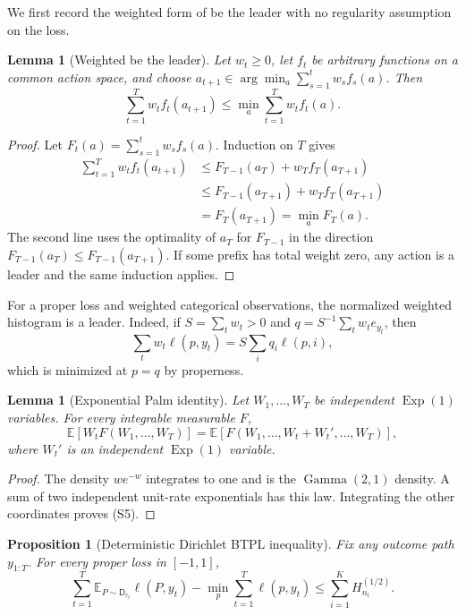 \documentclass[twoside]{article}
\newtheorem{lemma}[theorem]{Lemma}
\newtheorem{proposition}[theorem]{Proposition}
\newcommand{\E}{\mathbb E}
\newcommand{\D}{\mathsf D}
\begin{document}
We first record the weighted form of be the leader with no regularity assumption on the loss.

\begin{lemma}[Weighted be the leader]
\label{lem:weighted-btl}
Let $w_t\geq0$, let $f_t$ be arbitrary functions on a common action space, and choose $a_{t+1}\in\arg\min_a\sum_{s=1}^tw_sf_s(a)$. Then
\[
\sum_{t=1}^Tw_tf_t(a_{t+1})\leq\min_a\sum_{t=1}^Tw_tf_t(a).
\tag{S4}
\]
\end{lemma}

\begin{proof}
Let $F_t(a)=\sum_{s=1}^tw_sf_s(a)$. Induction on $T$ gives
\begin{align*}
\sum_{t=1}^Tw_tf_t(a_{t+1})
&\leq F_{T-1}(a_T)+w_Tf_T(a_{T+1})\\
&\leq F_{T-1}(a_{T+1})+w_Tf_T(a_{T+1})\\
&=F_T(a_{T+1})=\min_aF_T(a).
\end{align*}
The second line uses the optimality of $a_T$ for $F_{T-1}$ in the direction $F_{T-1}(a_T)\leq F_{T-1}(a_{T+1})$. If some prefix has total weight zero, any action is a leader and the same induction applies.
\end{proof}

For a proper loss and weighted categorical observations, the normalized weighted histogram is a leader. Indeed, if $S=\sum_tw_t>0$ and $q=S^{-1}\sum_tw_te_{y_t}$, then
\[
\sum_tw_t\ell(p,y_t)=S\sum_iq_i\ell(p,i),
\]
which is minimized at $p=q$ by properness.

\begin{lemma}[Exponential Palm identity]
\label{lem:palm}
Let $W_1,\ldots,W_T$ be independent $\operatorname{Exp}(1)$ variables. For every integrable measurable $F$,
\[
\E[W_tF(W_1,\ldots,W_T)]
=\E[F(W_1,\ldots,W_t+W_t',\ldots,W_T)],
\tag{S5}
\]
where $W_t'$ is an independent $\operatorname{Exp}(1)$ variable.
\end{lemma}

\begin{proof}
The density $we^{-w}$ integrates to one and is the $\operatorname{Gamma}(2,1)$ density. A sum of two independent unit-rate exponentials has this law. Integrating the other coordinates proves (S5).
\end{proof}

\begin{proposition}[Deterministic Dirichlet BTPL inequality]
\label{prop:det-btpl}
Fix any outcome path $y_{1:T}$. For every proper loss in $[-1,1]$,
\[
\sum_{t=1}^T\E_{P\sim\D_{c_t}}\ell(P,y_t)
-\min_p\sum_{t=1}^T\ell(p,y_t)
\leq\sum_{i=1}^KH_{n_i}^{(1/2)}.
\tag{S6}
\]
\end{proposition}
\end{document}
